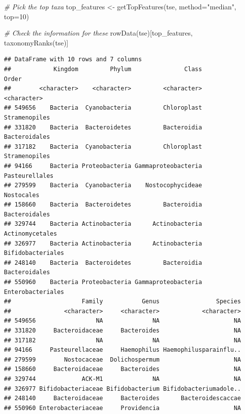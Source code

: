 \documentclass[
]{book}
\newenvironment{Shaded}{\begin{snugshade}}{\end{snugshade}}
\newcommand{\AttributeTok}[1]{\textcolor[rgb]{0.77,0.63,0.00}{#1}}
\newcommand{\CommentTok}[1]{\textcolor[rgb]{0.56,0.35,0.01}{\textit{#1}}}
\newcommand{\DecValTok}[1]{\textcolor[rgb]{0.00,0.00,0.81}{#1}}
\newcommand{\FunctionTok}[1]{\textcolor[rgb]{0.00,0.00,0.00}{#1}}
\newcommand{\NormalTok}[1]{#1}
\newcommand{\OtherTok}[1]{\textcolor[rgb]{0.56,0.35,0.01}{#1}}
\newcommand{\StringTok}[1]{\textcolor[rgb]{0.31,0.60,0.02}{#1}}
\begin{document}
\begin{Shaded}
\begin{Highlighting}[]
\CommentTok{\# Pick the top taxa}
\NormalTok{top\_features }\OtherTok{\textless{}{-}} \FunctionTok{getTopFeatures}\NormalTok{(tse, }\AttributeTok{method=}\StringTok{"median"}\NormalTok{, }\AttributeTok{top=}\DecValTok{10}\NormalTok{)}

\CommentTok{\# Check the information for these}
\FunctionTok{rowData}\NormalTok{(tse)[top\_features, }\FunctionTok{taxonomyRanks}\NormalTok{(tse)]}
\end{Highlighting}
\end{Shaded}

\begin{verbatim}
## DataFrame with 10 rows and 7 columns
##            Kingdom         Phylum               Class             Order
##        <character>    <character>         <character>       <character>
## 549656    Bacteria  Cyanobacteria         Chloroplast     Stramenopiles
## 331820    Bacteria  Bacteroidetes         Bacteroidia     Bacteroidales
## 317182    Bacteria  Cyanobacteria         Chloroplast     Stramenopiles
## 94166     Bacteria Proteobacteria Gammaproteobacteria    Pasteurellales
## 279599    Bacteria  Cyanobacteria    Nostocophycideae        Nostocales
## 158660    Bacteria  Bacteroidetes         Bacteroidia     Bacteroidales
## 329744    Bacteria Actinobacteria      Actinobacteria   Actinomycetales
## 326977    Bacteria Actinobacteria      Actinobacteria Bifidobacteriales
## 248140    Bacteria  Bacteroidetes         Bacteroidia     Bacteroidales
## 550960    Bacteria Proteobacteria Gammaproteobacteria Enterobacteriales
##                    Family           Genus                Species
##               <character>     <character>            <character>
## 549656                 NA              NA                     NA
## 331820     Bacteroidaceae     Bacteroides                     NA
## 317182                 NA              NA                     NA
## 94166     Pasteurellaceae     Haemophilus Haemophilusparainflu..
## 279599        Nostocaceae  Dolichospermum                     NA
## 158660     Bacteroidaceae     Bacteroides                     NA
## 329744             ACK-M1              NA                     NA
## 326977 Bifidobacteriaceae Bifidobacterium Bifidobacteriumadole..
## 248140     Bacteroidaceae     Bacteroides      Bacteroidescaccae
## 550960 Enterobacteriaceae     Providencia                     NA
\end{verbatim}
\end{document}
